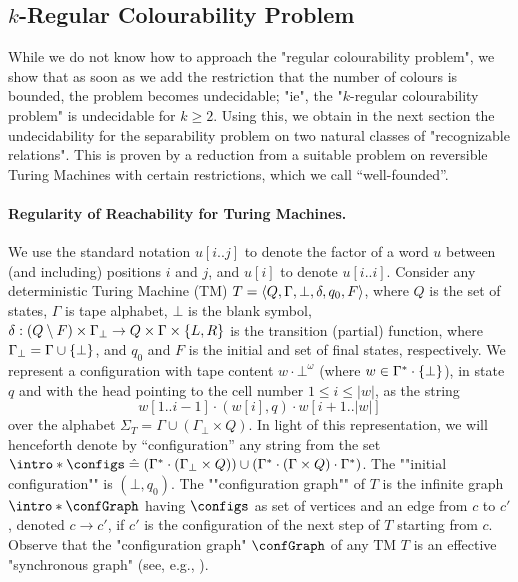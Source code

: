 \subsection{$k$-Regular Colourability Problem}

While we do not know how to approach the "regular colourability problem", we show that as soon as we add the restriction that the number of colours is bounded, the problem becomes undecidable;
"ie", the "$k$-regular colourability problem" is undecidable for $k\geq 2$. Using this, we obtain in the next section 
the undecidability for the separability problem on two natural classes of 
"recognizable relations". This is proven by a reduction from a suitable problem on reversible 
Turing Machines with certain restrictions, which we call ``well-founded''.

\paragraph*{Regularity of Reachability for Turing Machines.}
We use the standard notation $u[i..j]$ to denote the factor of a word $u$ between (and including) positions $i$ and $j$, and $u[i]$ to denote $u[i..i]$.
Consider any deterministic Turing Machine (TM) $T = \langle Q,\Gamma,\bot,\delta,q_0,F\rangle$, where $Q$ is the set of states, $\Gamma$ is tape alphabet, $\bot$ is the blank symbol, $\delta: (Q \setminus F) \times \Gamma_\bot \to Q \times \Gamma \times \{L,R\}$ is the transition (partial) function, where $\Gamma_\bot = \Gamma \cup \{\bot\}$, and $q_0$ and $F$ is the initial and set of final states, respectively.
%
We represent a configuration with tape content $w \cdot \bot^\omega$ (where $w \in \Gamma^* \cdot \{\bot\}$), in state $q$ and with the head pointing to the cell number $1 \leq i \leq |w|$, as the string
\[
   w[1..i-1] \cdot (w[i],q) \cdot w[i+1..|w|] 
\]
over the alphabet $\Sigma_T = \Gamma \cup (\Gamma_\bot \times Q)$.
\AP In light of this representation, we will henceforth denote by ``configuration'' any string from the set  $\intro*\configs \defeq (\Gamma^* \cdot (\Gamma_\bot \times Q)) \cup  (\Gamma^* \cdot (\Gamma \times Q) \cdot \Gamma^*)$. The ""initial configuration"" is $(\bot,q_0)$.
\AP The ""configuration graph"" of $T$ is the infinite graph $\intro*\confGraph$ having $\configs$ as set of vertices and an edge from $c$ to $c'$, denoted $c \rightarrow c'$, if $c'$ is the configuration of the next step of $T$ starting from $c$. Observe that the "configuration graph" $\confGraph$ of any TM $T$ is an effective "synchronous graph" (see, e.g., \cite{KuskeLohrey2010AutomaticGraphs}).

